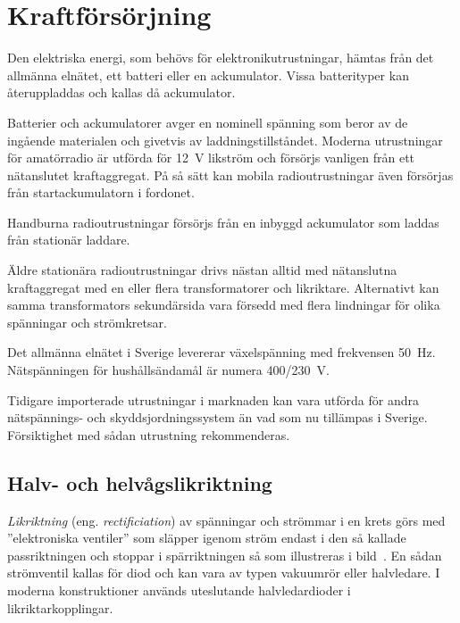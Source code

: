 \section{Kraftförsörjning}
\label{kraftaggregat}
\label{sec:kraftfoersoerjning}

Den elektriska energi, som behövs för elektronikutrustningar, hämtas
från det allmänna elnätet, ett batteri eller en
ackumulator.
Vissa batterityper kan återuppladdas och kallas då ackumulator.

Batterier och ackumulatorer avger en nominell spänning som beror av
de ingående materialen och givetvis av laddningstillståndet.
Moderna utrustningar för amatörradio är utförda för \qty{12}{\volt} likström och
försörjs vanligen från ett nätanslutet kraftaggregat.
På så sätt kan mobila radioutrustningar även försörjas från startackumulatorn
i fordonet.

Handburna radioutrustningar försörjs från en inbyggd ackumulator som laddas
från stationär laddare.

Äldre stationära radioutrustningar drivs nästan alltid med nätanslutna
kraftaggregat med en eller flera transformatorer och likriktare.
Alternativt kan samma transformators sekundärsida vara
försedd med flera lindningar för olika spänningar och strömkretsar.

Det allmänna elnätet i Sverige levererar växelspänning med frekvensen
\qty{50}{\hertz}.
Nätspänningen för hushållsändamål är numera 400/\qty{230}{\volt}.

Tidigare importerade utrustningar i marknaden kan vara utförda för andra
nätspännings- och skyddsjordningssystem än vad som nu tillämpas i Sverige.
Försiktighet med sådan utrustning rekommenderas.


\subsection{Halv- och helvågslikriktning}
\label{likriktning}

\emph{Likriktning} (eng. \emph{rectificiation}) av spänningar och strömmar i en
krets görs med ''elektroniska ventiler'' som släpper igenom ström endast i den
så kallade passriktningen och stoppar i spärriktningen så som illustreras i
bild~.
En sådan strömventil kallas för diod och kan vara av typen vakuumrör eller
halvledare.
I moderna konstruktioner används uteslutande halvledardioder i
likriktarkopplingar.

